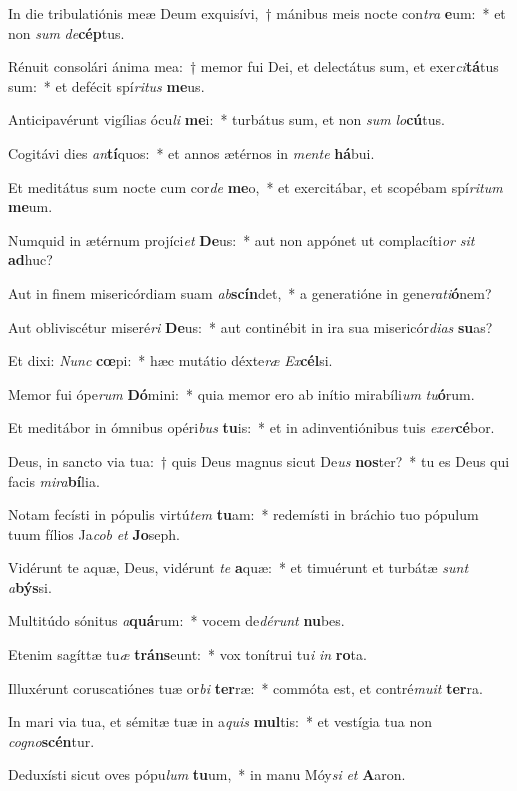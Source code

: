 \item In die tribulatiónis meæ Deum exquisívi,~† mánibus meis nocte con\textit{tra} \textbf{e}um:~* et non \textit{sum} \textit{de}\textbf{cép}tus.
\item Rénuit consolári ánima mea:~† memor fui Dei, et delectátus sum, et exer\textit{ci}\textbf{tá}tus sum:~* et defécit spí\textit{ri}\textit{tus} \textbf{me}us.
\item Anticipavérunt vigílias ócu\textit{li} \textbf{me}i:~* turbátus sum, et non \textit{sum} \textit{lo}\textbf{cú}tus.
\item Cogitávi dies \textit{an}\textbf{tí}quos:~* et annos ætérnos in \textit{men}\textit{te} \textbf{há}bui.
\item Et meditátus sum nocte cum cor\textit{de} \textbf{me}o,~* et exercitábar, et scopébam spí\textit{ri}\textit{tum} \textbf{me}um.
\item Numquid in ætérnum projíci\textit{et} \textbf{De}us:~* aut non appónet ut complacíti\textit{or} \textit{sit} \textbf{ad}huc?
\item Aut in finem misericórdiam suam \textit{ab}\textbf{scín}det,~* a generatióne in gene\textit{ra}\textit{ti}\textbf{ó}nem?
\item Aut obliviscétur miseré\textit{ri} \textbf{De}us:~* aut continébit in ira sua misericór\textit{di}\textit{as} \textbf{su}as?
\item Et dixi: \textit{Nunc} \textbf{cœ}pi:~* hæc mutátio déxte\textit{ræ} \textit{Ex}\textbf{cél}si.
\item Memor fui ópe\textit{rum} \textbf{Dó}mini:~* quia memor ero ab inítio mirabíli\textit{um} \textit{tu}\textbf{ó}rum.
\item Et meditábor in ómnibus opéri\textit{bus} \textbf{tu}is:~* et in adinventiónibus tuis \textit{ex}\textit{er}\textbf{cé}bor.
\item Deus, in sancto via tua:~† quis Deus magnus sicut De\textit{us} \textbf{nos}ter?~* tu es Deus qui facis \textit{mi}\textit{ra}\textbf{bí}lia.
\item Notam fecísti in pópulis virtú\textit{tem} \textbf{tu}am:~* redemísti in bráchio tuo pópulum tuum fílios Ja\textit{cob} \textit{et} \textbf{Jo}seph.
\item Vidérunt te aquæ, Deus, vidérunt \textit{te} \textbf{a}quæ:~* et timuérunt et turbátæ \textit{sunt} \textit{a}\textbf{býs}si.
\item Multitúdo sónitus \textit{a}\textbf{quá}rum:~* vocem de\textit{dé}\textit{runt} \textbf{nu}bes.
\item Etenim sagíttæ tu\textit{æ} \textbf{tráns}eunt:~* vox tonítrui tu\textit{i} \textit{in} \textbf{ro}ta.
\item Illuxérunt coruscatiónes tuæ or\textit{bi} \textbf{ter}ræ:~* commóta est, et contré\textit{mu}\textit{it} \textbf{ter}ra.
\item In mari via tua, et sémitæ tuæ in a\textit{quis} \textbf{mul}tis:~* et vestígia tua non \textit{co}\textit{gno}\textbf{scén}tur.
\item Deduxísti sicut oves pópu\textit{lum} \textbf{tu}um,~* in manu Móy\textit{si} \textit{et} \textbf{A}aron.
